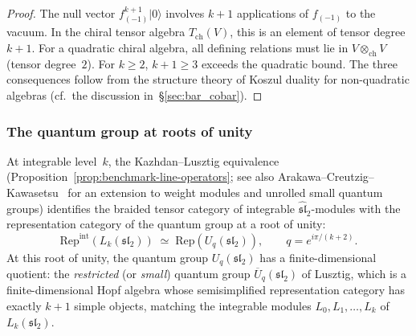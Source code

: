 \begin{proof}
The null vector $f_{(-1)}^{k+1}|0\rangle$ involves $k+1$
applications of $f_{(-1)}$ to the vacuum. In the chiral
tensor algebra $T_{\mathrm{ch}}(V)$, this is an element of
tensor degree $k + 1$. For a quadratic chiral algebra, all
defining relations must lie in $V \otimes_{\mathrm{ch}} V$
(tensor degree~$2$). For $k \ge 2$, $k + 1 \ge 3$ exceeds
the quadratic bound. The three consequences follow from the
structure theory of Koszul duality for non-quadratic algebras
(cf.\ the discussion in~\S\ref{sec:bar_cobar}).
\end{proof}


\subsubsection{The quantum group at roots of unity}
\label{subsubsec:quantum-group-roots}

At integrable level~$k$, the Kazhdan--Lusztig equivalence
(Proposition~\ref{prop:benchmark-line-operators};
see also Arakawa--Creutzig--Kawasetsu~\cite{ACK24b}
for an extension to weight modules and unrolled
small quantum groups) identifies
the braided tensor category of integrable
$\widehat{\mathfrak{sl}}_2$-modules with the representation
category of the quantum group at a root of unity:
\begin{equation}\label{eq:KL-root-unity}
 \mathrm{Rep}^{\mathrm{int}}(L_k(\mathfrak{sl}_2))
 \;\simeq\;
 \mathrm{Rep}(U_q(\mathfrak{sl}_2)),
 \qquad
 q = e^{i\pi/(k+2)}.
\end{equation}
At this root of unity, the quantum group $U_q(\mathfrak{sl}_2)$
has a finite-dimensional quotient: the \emph{restricted}
(or \emph{small}) quantum group $\overline{U}_q(\mathfrak{sl}_2)$
of Lusztig, which is a finite-dimensional Hopf algebra whose
semisimplified representation category has exactly $k + 1$
simple objects, matching the integrable modules
$L_0, L_1, \ldots, L_k$ of $L_k(\mathfrak{sl}_2)$.

